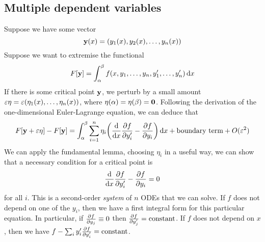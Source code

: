 \subsection{Multiple dependent variables}
Suppose we have some vector
\[
	\vb y(x) = (y_1(x), y_2(x), \dots, y_n(x))
\]
Suppose we want to extremise the functional
\[
	F[\vb y] = \int_\alpha^\beta f(x, y_1, \dots, y_n, y'_1, \dots, y'_n) \dd{x}
\]
If there is some critical point \( \vb y \), we perturb by a small amount \( \varepsilon\vb \eta = \varepsilon(\eta_1(x), \dots, \eta_n(x)) \), where \( \vb\eta(\alpha) = \vb\eta(\beta) = \vb 0 \).
Following the derivation of the one-dimensional Euler-Lagrange equation, we can deduce that
\[
	F[\vb y + \varepsilon \vb \eta] - F[\vb y] = \int_\alpha^\beta \sum_{i=1}^n \eta_i \qty(\dv{x}\pdv{f}{y_i'} - \pdv{f}{y_i})\dd{x} + \text{boundary term} + O(\varepsilon^2)
\]
We can apply the fundamental lemma, choosing \( \eta_i \) in a useful way, we can show that a necessary condition for a critical point is
\[
	\dv{x}\pdv{f}{y_i'} - \pdv{f}{y_i} = 0
\]
for all \( i \).
This is a second-order \textit{system} of \( n \) ODEs that we can solve.
If \( f \) does not depend on one of the \( y_i \), then we have a first integral form for this particular equation.
In particular, if \( \pdv{f}{y_j} \equiv 0 \) then \( \pdv{f}{y_j'} = \text{constant} \).
If \( f \) does not depend on \( x \), then we have \( f - \sum_i y_i' \pdv{f}{y_i'} = \text{constant} \).
